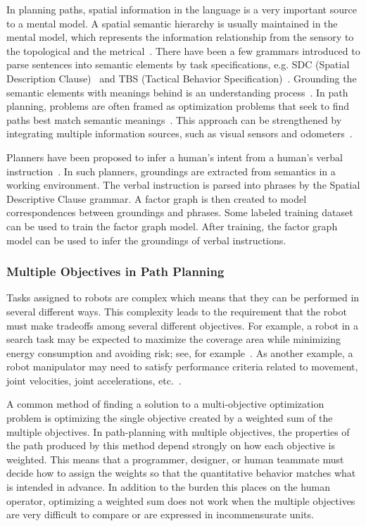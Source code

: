 \documentclass[phd]{byuprop}
\begin{document}
In planning paths, spatial information in the language is a very important source to a mental model.
A spatial semantic hierarchy is usually maintained in the mental model, which represents the information relationship from the sensory to the topological and the metrical~\cite{kuipers1999}.
There have been a few grammars introduced to parse sentences into semantic elements by task specifications, e.g. SDC (Spatial Description Clause)~\cite{tellex2011understanding} and TBS (Tactical Behavior Specification)~\cite{Boularias_2015_7953}.
Grounding the semantic elements with meanings behind is an understanding process~\cite{Kollar:2010:TUN:1734454.1734553}.
In path planning, problems are often framed as optimization problems that seek to find paths best match semantic meanings~\cite{tellex2011understanding,Boularias_2015_7953}.
This approach can be strengthened by integrating multiple information sources, such as visual sensors and odometers~\cite{6696569}.

Planners have been proposed to infer a human's intent from a human's verbal instruction~\cite{howard2014natural,Duvallet2014}.
In such planners, groundings are extracted from semantics in a working environment.
The verbal instruction is parsed into phrases by the Spatial Descriptive Clause grammar. 
A factor graph is then created to model correspondences between groundings and phrases.
Some labeled training dataset can be used to train the factor graph model.
After training, the factor graph model can be used to infer the groundings of verbal instructions.

\subsubsection{Multiple Objectives in Path Planning}
\label{sec:related_work:algorithm_specific_work:multiple_objectives_in_path_planning}

Tasks assigned to robots are complex which means that they can be performed in several different ways.
This complexity leads to the requirement that the robot must make tradeoffs among several different objectives.
For example, a robot in a search task may be expected to maximize the coverage area while minimizing energy consumption and avoiding risk; see, for example~\cite{Mei2005,Yi2014}. 
As another example, a robot manipulator may need to satisfy performance criteria related to movement, joint velocities, joint accelerations, etc.~\cite{Pires2004}.

A common method of finding a solution to a multi-objective optimization problem is optimizing the single objective created by a weighted sum of the multiple objectives.  
In path-planning with multiple objectives, the properties of the path produced by this method depend strongly on how each objective is weighted. 
This means that a programmer, designer, or human teammate must decide how to assign the weights so that the quantitative behavior matches what is intended in advance.  
In addition to the burden this places on the human operator, optimizing a weighted sum does not work when the multiple objectives are very difficult to compare or are expressed in incommensurate units.
\end{document}
